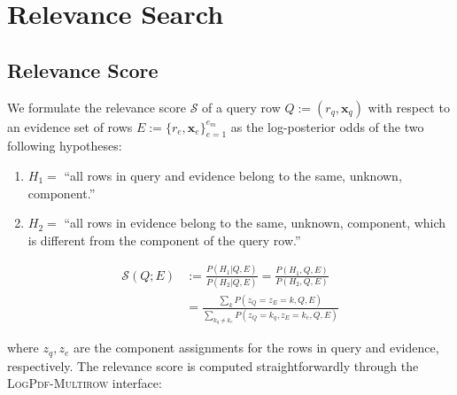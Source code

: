 \documentclass{article}
\newcommand{\set}[1]{\{{#1}\}}
\begin{document}
\newpage
\section{Relevance Search}

\subsection{Relevance Score}
We formulate the relevance score $\mathcal{S}$ of a query row
$Q:=(r_q, \bm{x}_q)$ with respect to an evidence set of rows
$E:=\set{r_{e}, \bm{x}_e}_{e=1}^{e_m}$ as the log-posterior odds of
the two following hypotheses:

\begin{enumerate}
\item $H_1 = $ ``all rows in query and evidence belong to the same, unknown, component.''
\item $H_2 = $ ``all rows in evidence belong to the same, unknown, component, which is different from the component of the query row.''
\end{enumerate}

\begin{align*}
  \mathcal{S}(Q;E) &:= \frac{P(H_1|Q,E)}{P(H_2|Q,E)} = \frac{P(H_1,Q,E)}{P(H_2,Q,E)} \\
      &= \frac{\sum_k P(z_Q=z_E=k,Q,E)}{\sum_{k_q \neq k_e} P(z_Q=k_q, z_E=k_e,Q,E)}
\end{align*}

where $z_q, z_e$ are the component assignments for the rows in query and evidence, respectively. The relevance score is computed straightforwardly through the \textsc{LogPdf-Multirow} interface: 
\end{document}
